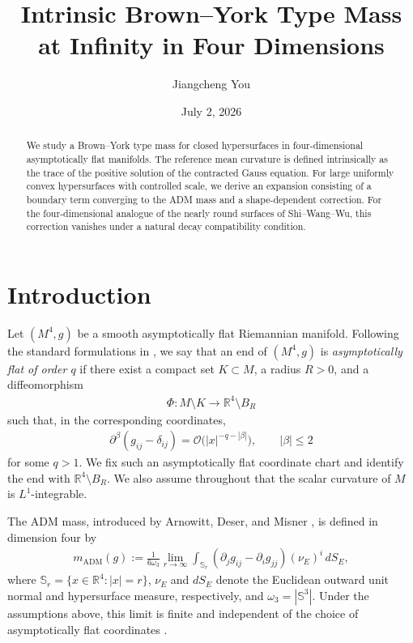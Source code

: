 \documentclass[10pt]{amsart}
\title{Intrinsic Brown--York Type Mass at Infinity in Four Dimensions}
\author{Jiangcheng You}
\date{July 2, 2026}
\newcommand{\R}{\mathbb{R}}
\newcommand{\Sph}{\mathbb{S}}
\newcommand{\ADM}{\mathrm{ADM}}
\theoremstyle{plain}
\theoremstyle{remark}
\begin{document}
	
	
	\begin{abstract}
		We study a Brown--York type mass for closed hypersurfaces in
		four-dimensional asymptotically flat manifolds. The reference mean
		curvature is defined intrinsically as the trace of the positive
		solution of the contracted Gauss equation. For large uniformly convex
		hypersurfaces with controlled scale, we derive an expansion consisting
		of a boundary term converging to the ADM mass and a shape-dependent
		correction. For the four-dimensional analogue of the nearly round
		surfaces of Shi--Wang--Wu, this correction vanishes under a natural
		decay compatibility condition.
	\end{abstract}
	
	
	
	\maketitle
	
	
	\section{Introduction}
	
	Let $(M^4,g)$ be a smooth asymptotically flat
	Riemannian manifold. Following the standard formulations in
	\cite{Bartnik86,LeeParker,McCormick24}, we say that an end of $(M^4,g)$ is
	\emph{asymptotically flat of order $q$} if there exist a compact set
	$K\subset M$, a radius $R>0$, and a diffeomorphism
	\begin{align*}
		\Phi:M\setminus K\longrightarrow \R^4\setminus B_R
	\end{align*}
	such that, in the corresponding coordinates,
	\begin{align*}
		\partial^\beta(g_{ij}-\delta_{ij})
		=
		\mathcal O\bigl(|x|^{-q-|\beta|}\bigr),
		\qquad
		|\beta|\leq 2
	\end{align*}
	for some $q>1$. We fix such an asymptotically flat coordinate
	chart and identify the end with $\R^4\setminus B_R$. We also assume throughout that the scalar curvature of $M$ is $L^1$-integrable.
	
	The ADM mass, introduced by Arnowitt, Deser, and Misner \cite{ADM}, is
	defined in dimension four by
	\begin{align}\label{eq:four-dimensional-ADM-mass}
		m_{\ADM}(g)
		:=
		\frac{1}{6\omega_3}
		\lim_{r\to\infty}
		\int_{\Sph_r}
		\left(
		\partial_jg_{ij}
		-
		\partial_ig_{jj}
		\right)
		(\nu_E)^i\,dS_E,
	\end{align}
	where $\Sph_r=\{x\in\R^4:|x|=r\}$, $\nu_E$ and $dS_E$ denote the
	Euclidean outward unit normal and hypersurface measure, respectively, and
	$\omega_3=|\Sph^3|$. Under the assumptions above, this limit is finite and
	independent of the choice of asymptotically flat coordinates
	\cite{Bartnik86,McCormick24}.
	
\end{document}
